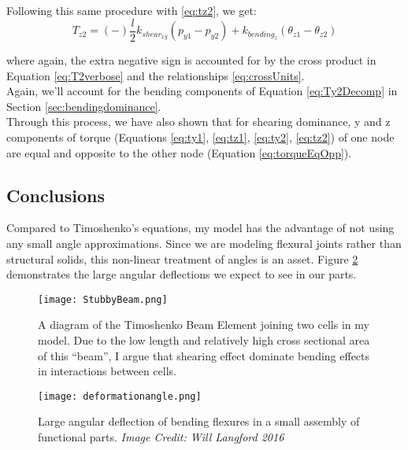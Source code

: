 {Following this same procedure with \ref{eq:tz2}, we get:
\[  T_{z2} =  (-)\dfrac{l}{2}k_{shear_{xy}}(p_{y1} - p_{y2}) + k_{bending_z}(\theta_{z1}  - \theta_{z2}) \]

where again, the extra negative sign is accounted for by the cross product in Equation \ref{eq:T2verbose} and the relationships \ref{eq:crossUnits}.\\

Again, we'll account for the bending components of Equation \ref{eq:Ty2Decomp} in Section \ref{sec:bendingdominance}.\\

Through this process, we have also shown that for shearing dominance, y and z components of torque (Equations \ref{eq:ty1}, \ref{eq:tz1}, \ref{eq:ty2}, \ref{eq:tz2}) of one node are equal and opposite to the other node (Equation \ref{eq:torqueEqOpp}).

%

\subsection{Conclusions}

Compared to Timoshenko's equations, my model has the advantage of not using any small angle approximations.  Since we are modeling flexural joints rather than structural solids, this non-linear treatment of angles is an asset.  Figure \ref{fig:deformationangle} demonstrates the large angular deflections we expect to see in our parts.\\

\begin{figure}
  \texttt{[image: StubbyBeam.png]}
  \caption{A diagram of the Timoshenko Beam Element joining two cells in my model.  Due to the low length and relatively high cross sectional area of this ``beam'', I argue that shearing effect dominate bending effects in interactions between cells.}
  \label{fig:StubbyBeam}
\end{figure}

\begin{figure}
  \texttt{[image: deformationangle.png]}
  \caption{Large angular deflection of bending flexures in a small assembly of functional parts. \textit{Image Credit: Will Langford 2016}}
  \label{fig:deformationangle}
\end{figure}

}
